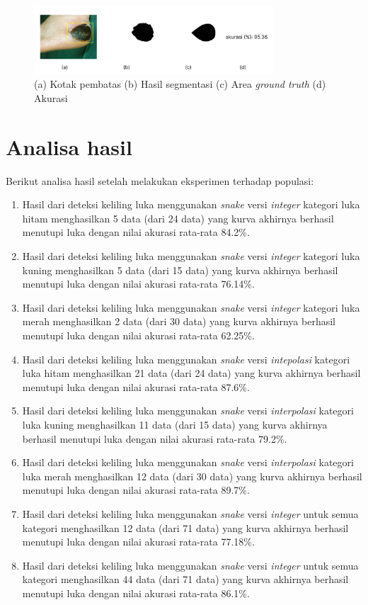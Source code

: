 \begin{figure}[H]
	\centering
	\includegraphics[width=0.8\textwidth]{gambar/hasil_bab4.jpg}
	\caption{(a) Kotak pembatas (b) Hasil segmentasi (c) Area \emph{ground truth} (d) Akurasi}
	\label{img:hasil_segmentasi}
\end{figure}

\section{Analisa hasil}
Berikut analisa hasil setelah melakukan eksperimen terhadap populasi:
\begin{enumerate}
	\item Hasil dari deteksi keliling luka menggunakan \emph{snake} versi \emph{integer} kategori luka hitam menghasilkan 5 data (dari 24 data) yang kurva akhirnya berhasil menutupi luka dengan nilai akurasi rata-rata 84.2\%.
	\item Hasil dari deteksi keliling luka menggunakan \emph{snake} versi \emph{integer} kategori luka kuning menghasilkan 5 data (dari 15 data) yang kurva akhirnya berhasil menutupi luka dengan nilai akurasi rata-rata 76.14\%.
	\item Hasil dari deteksi keliling luka menggunakan \emph{snake} versi \emph{integer} kategori luka merah menghasilkan 2 data (dari 30 data) yang kurva akhirnya berhasil menutupi luka dengan nilai akurasi rata-rata 62.25\%.
	\item Hasil dari deteksi keliling luka menggunakan \emph{snake} versi \emph{intepolasi} kategori luka hitam menghasilkan 21 data (dari 24 data) yang kurva akhirnya berhasil menutupi luka dengan nilai akurasi rata-rata 87.6\%.
	\item Hasil dari deteksi keliling luka menggunakan \emph{snake} versi \emph{interpolasi} kategori luka kuning menghasilkan 11 data (dari 15 data) yang kurva akhirnya berhasil menutupi luka dengan nilai akurasi rata-rata 79.2\%.
	\item Hasil dari deteksi keliling luka menggunakan \emph{snake} versi \emph{interpolasi} kategori luka merah menghasilkan 12 data (dari 30 data) yang kurva akhirnya berhasil menutupi luka dengan nilai akurasi rata-rata 89.7\%.
	\item Hasil dari deteksi keliling luka menggunakan \emph{snake} versi \emph{integer} untuk semua kategori menghasilkan 12 data (dari 71 data) yang kurva akhirnya berhasil menutupi luka dengan nilai akurasi rata-rata 77.18\%.
	\item Hasil dari deteksi keliling luka menggunakan \emph{snake} versi \emph{integer} untuk semua kategori menghasilkan 44 data (dari 71 data) yang kurva akhirnya berhasil menutupi luka dengan nilai akurasi rata-rata 86.1\%.
\end{enumerate}

